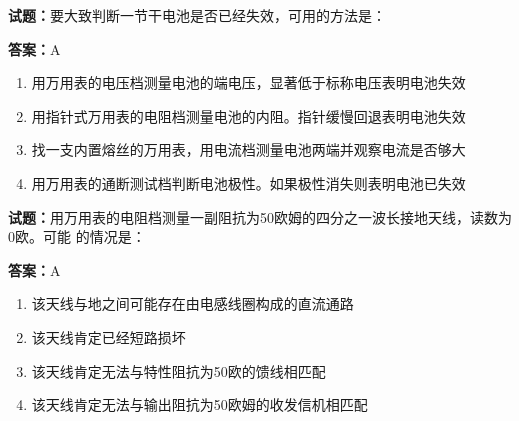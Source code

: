 \documentclass{ctexbook}
\begin{document}




\vspace{1em}

\textbf{试题：}要大致判断一节干电池是否已经失效，可用的方法是： 

\textbf{答案：}A 

\begin{enumerate}[leftmargin=3em]
  \item 用万用表的电压档测量电池的端电压，显著低于标称电压表明电池失效 

  \item 用指针式万用表的电阻档测量电池的内阻。指针缓慢回退表明电池失效 

  \item 找一支内置熔丝的万用表，用电流档测量电池两端并观察电流是否够大 

  \item 用万用表的通断测试档判断电池极性。如果极性消失则表明电池已失效 

\end{enumerate}





\vspace{1em}

\textbf{试题：}用万用表的电阻档测量一副阻抗为50欧姆的四分之一波长接地天线，读数为0欧。可能
的情况是： 

\textbf{答案：}A 

\begin{enumerate}[leftmargin=3em]
  \item 该天线与地之间可能存在由电感线圈构成的直流通路 

  \item 该天线肯定已经短路损坏 

  \item 该天线肯定无法与特性阻抗为50欧的馈线相匹配 

  \item 该天线肯定无法与输出阻抗为50欧姆的收发信机相匹配 

\end{enumerate}





\vspace{1em}
\end{document}
